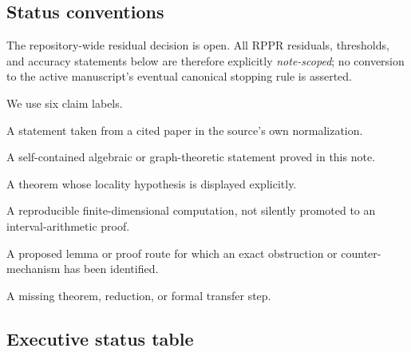 \subsection{Status conventions}

The repository-wide residual decision is open.  All RPPR residuals,
thresholds, and accuracy statements below are therefore explicitly
\emph{note-scoped}; no conversion to the active manuscript's eventual
canonical stopping rule is asserted.

We use six claim labels.
\begin{description}[style=nextline,leftmargin=2.8cm]
  \item[\SourceStatus] A statement taken from a cited paper in the source's
  own normalization.
  \item[\ProvedStatus] A self-contained algebraic or graph-theoretic statement
  proved in this note.
  \item[\ConditionalStatus] A theorem whose locality hypothesis is displayed
  explicitly.
  \item[\ComputedStatus] A reproducible finite-dimensional computation, not
  silently promoted to an interval-arithmetic proof.
  \item[\RefutedStatus] A proposed lemma or proof route for which an exact
  obstruction or counter-mechanism has been identified.
  \item[\OpenStatus] A missing theorem, reduction, or formal transfer step.
\end{description}

\subsection{Executive status table}

